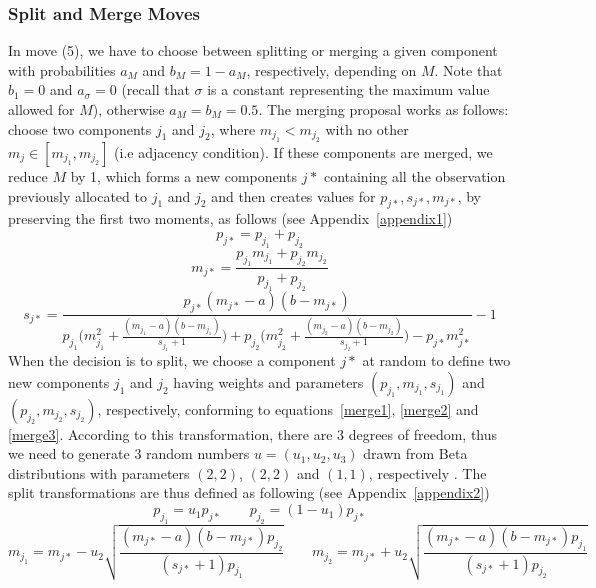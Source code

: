 \documentclass[journal,10pt]{elsart}
\begin{document}
\subsubsection{Split and Merge Moves}
In move (5), we have to choose between splitting or merging a given component with probabilities $a_M$ and $b_M=1-a_M$, respectively, depending on $M$.
Note that $b_1=0$ and $a_{\sigma}=0$ (recall that $\sigma$ is a constant representing the maximum value allowed for $M$), otherwise $a_M=b_M=0.5$.
The merging proposal works as follows: choose two components $j_1$ and $j_2$, where $m_{j_1}<m_{j_2}$ with no other $m_j \in [m_{j_1},m_{j_2}]$ (i.e adjacency condition).
If these components are merged, we reduce $M$ by 1, which forms a new components $j*$ containing all the observation previously allocated to $j_1$ and $j_2$ and then creates values for $p_{j*},s_{j*},m_{j*}$, by preserving the first two moments, as follows (see Appendix~\ref{appendix1})
\begin{equation}\label{merge1}
p_{j*}=p_{j_1}+p_{j_2}
\end{equation}
\begin{equation}\label{merge2}
m_{j*}=\frac{p_{j_1}m_{j_1}+p_{j_2}m_{j_2}}{p_{j_1}+p_{j_2}}
\end{equation}
\begin{equation}\label{merge3}
s_{j*}=\frac{p_{j*}(m_{j*}-a)(b-m_{j*})}{p_{j_1}\bigg(m_{j_1}^2+\frac{(m_{j_1}-a)(b-m_{j_1})}{s_{j_1}+1}\bigg)+p_{j_2}\bigg(m_{j_2}^2+\frac{(m_{j_2}-a)(b-m_{j_2})}{s_{j_2}+1}\bigg)-p_{j*}m_{j*}^2}-1
\end{equation}
When the decision is to split, we choose a component $j*$ at random to define two new components $j_1$ and $j_2$ having weights and parameters $(p_{j_1},m_{j_1},s_{j_1})$ and $(p_{j_2},m_{j_2},s_{j_2})$, respectively, conforming to equations~\ref{merge1}, \ref{merge2} and \ref{merge3}. According to this transformation, there are 3 degrees of freedom, thus we need to generate 3 random numbers $u=(u_1,u_2,u_3)$ drawn from Beta distributions with parameters $(2,2)$, $(2,2)$ and $(1,1)$, respectively \cite{Green1997}. The split transformations are thus defined as following (see Appendix~\ref{appendix2})
\begin{equation}\label{split1}
p_{j_1}=u_1 p_{j*}\qquad p_{j_2}=(1-u_1) p_{j*}
\end{equation}
\begin{equation}\label{split2}
m_{j_1}=m_{j*}-u_2\sqrt{\frac{(m_{j*}-a)(b-m_{j*})p_{j_2}}{(s_{j*}+1)p_{j_1}}} \qquad m_{j_2}=m_{j*}+u_2\sqrt{\frac{(m_{j*}-a)(b-m_{j*})p_{j_1}}{(s_{j*}+1)p_{j_2}}}
\end{equation}
\end{document}
